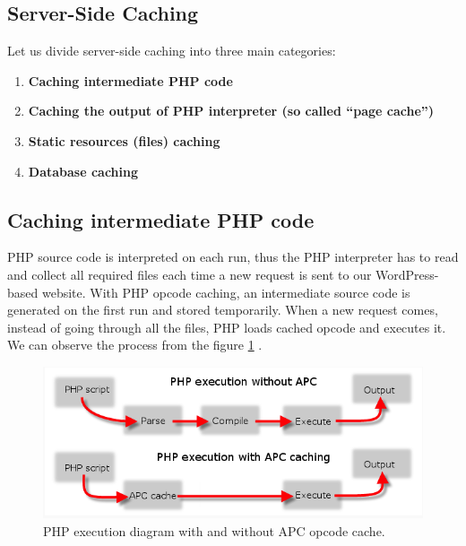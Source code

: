 \subsection{Server-Side Caching}

Let us divide server-side \gls{caching} into three main categories:

\begin{enumerate}
    \item\textbf{Caching intermediate PHP code}
    \item\textbf{Caching the output of PHP interpreter (so called “page cache”)}
    \item\textbf{Static resources (files) caching}
    \item\textbf{Database caching}
  \end{enumerate}

\subsection*{Caching intermediate PHP code}

PHP source code is interpreted on each run, thus the PHP interpreter has to read and collect all required files each time a new request is sent to our WordPress-based website. With PHP opcode caching, an intermediate source code is generated on the first run and stored temporarily. When a new request comes, instead of going through all the files, PHP loads cached opcode and executes it. We can observe the process from the figure \ref{fig:php-opcode-caching} \cite{Fig:PHP-opcode-caching}.

\begin{figure}[H]
\begin{center}
\includegraphics[scale=0.5]{figures/php-opcode-caching.png}
\caption{PHP execution diagram with and without APC opcode cache.}
\label{fig:php-opcode-caching}
\end{center}
\end{figure}

